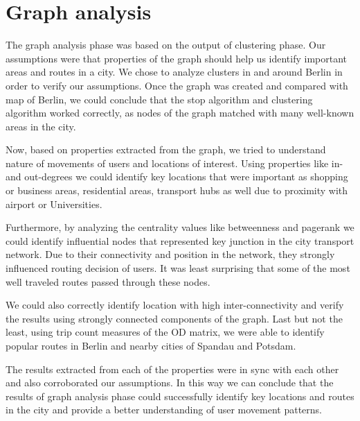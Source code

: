 \section{Graph analysis}
The graph analysis phase was based on the output of clustering phase. Our assumptions were that properties of the graph should help us identify important areas and routes in a city. We chose to analyze clusters in and around Berlin in order to verify our assumptions. Once the graph was created and compared with map of Berlin, we could conclude that the stop algorithm and clustering algorithm worked correctly, as nodes of the graph matched with many well-known areas in the city. 

Now, based on properties extracted from the graph, we tried to understand nature of movements of users and locations of interest. Using properties like in- and out-degrees we could identify key locations that were important as shopping or business areas, residential areas, transport hubs as well due to proximity with airport or Universities.
  
Furthermore, by analyzing the centrality values like betweenness and pagerank we could identify influential nodes that represented key junction in the city transport network. Due to their connectivity and position in the network, they strongly influenced routing decision of users. It was least surprising that some of the most well traveled routes passed through these nodes. 

We could also correctly identify location with high inter-connectivity and verify the results using strongly connected components of the graph. Last but not the least, using trip count measures of the OD matrix, we were able to identify popular routes in Berlin and nearby cities of Spandau and Potsdam.

The results extracted from each of the properties were in sync with each other and also corroborated our assumptions. In this way we can conclude that the results of graph analysis phase could successfully identify key locations and routes in the city and provide a better understanding of user movement patterns.

